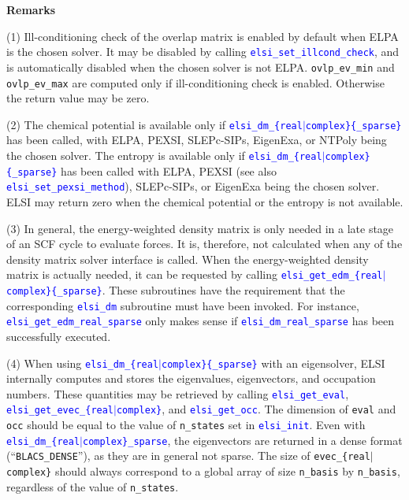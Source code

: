 \documentclass{report}
\newcommand{\api}[1]{\textcolor{blue}{\texttt{#1}}}
\begin{document}
\textbf{Remarks}

(1) Ill-conditioning check of the overlap matrix is enabled by default when ELPA is the chosen solver. It may be disabled by calling \api{elsi\_set\_illcond\_check}, and is automatically disabled when the chosen solver is not ELPA. \texttt{ovlp\_ev\_min} and \texttt{ovlp\_ev\_max} are computed only if ill-conditioning check is enabled. Otherwise the return value may be zero.

(2) The chemical potential is available only if \api{elsi\_dm\_\{real$\vert$complex\}\{\_sparse\}} has been called, with ELPA, PEXSI, SLEPc-SIPs, EigenExa, or NTPoly being the chosen solver. The entropy is available only if \api{elsi\_dm\_\{real$\vert$complex\}\{\_sparse\}} has been called with ELPA, PEXSI (see also \api{elsi\_set\_pexsi\_method}), SLEPc-SIPs, or EigenExa being the chosen solver. ELSI may return zero when the chemical potential or the entropy is not available.

(3) In general, the energy-weighted density matrix is only needed in a late stage of an SCF cycle to evaluate forces. It is, therefore, not calculated when any of the density matrix solver interface is called. When the energy-weighted density matrix is actually needed, it can be requested by calling \api{elsi\_get\_edm\_\{real$\vert$complex\}\{\_sparse\}}. These subroutines have the requirement that the corresponding \api{elsi\_dm} subroutine must have been invoked. For instance, \api{elsi\_get\_edm\_real\_sparse} only makes sense if \api{elsi\_dm\_real\_sparse} has been successfully executed.

(4) When using \api{elsi\_dm\_\{real$\vert$complex\}\{\_sparse\}} with an eigensolver, ELSI internally computes and stores the eigenvalues, eigenvectors, and occupation numbers. These quantities may be retrieved by calling \api{elsi\_get\_eval}, \api{elsi\_get\_evec\_\{real$\vert$complex\}}, and \api{elsi\_get\_occ}. The dimension of \texttt{eval} and \texttt{occ} should be equal to the value of \texttt{n\_states} set in \api{elsi\_init}. Even with \api{elsi\_dm\_\{real$\vert$complex\}\_sparse}, the eigenvectors are returned in a dense format (``\texttt{BLACS\_DENSE}''), as they are in general not sparse. The size of \texttt{evec\_\{real$\vert$complex\}} should always correspond to a global array of size \texttt{n\_basis} by \texttt{n\_basis}, regardless of the value of \texttt{n\_states}.
\end{document}
